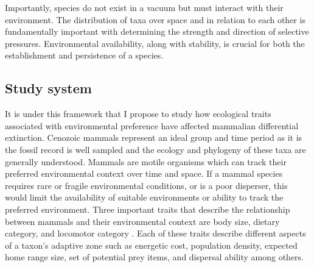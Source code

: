 \documentclass[11pt,letterpaper]{article}
\begin{document}
Importantly, species do not exist in a vacuum but must interact with their environment. The distribution of taxa over space and in relation to each other is fundamentally important with determining the strength and direction of selective pressures. %
Environmental availability, along with stability, is crucial for both the establishment and persistence of a species.

\subsection{Study system}  %
It is under this framework that I propose to study how ecological traits associated with environmental preference have affected mammalian differential extinction. Cenozoic mammals represent an ideal group and time period as it is the fossil record is well sampled and the ecology and phylogeny of these taxa are generally understood. Mammals are motile organisms which can track their preferred environmental context over time and space. If a mammal species requires rare or fragile environmental conditions, or is a poor disperser, this would limit the availability of suitable environments or ability to track the preferred environment. Three important traits that describe the relationship between mammals and their environmental context are body size, dietary category, and locomotor category \citep{Smith2004,Smith2008b,Damuth1981a,Damuth1979,Jernvall2004,Lyons2005,Lyons2010}. Each of these traits describe different aspects of a taxon's adaptive zone such as energetic cost, population density, expected home range size, set of potential prey items, and dispersal ability among others. 

\end{document}
